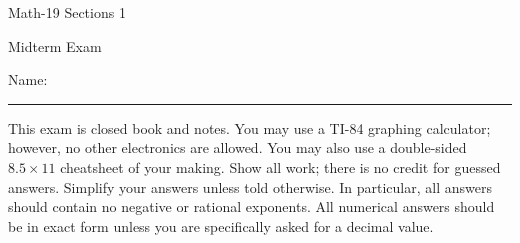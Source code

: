 \documentclass[letterpaper,12pt,fleqn]{article}
\begin{document}
\begin{center}
  \large
  Math-19 Sections 1

  \Large
  Midterm Exam
\end{center}

\vspace{0.5in}

Name: \rule{4in}{1pt}

\vspace{0.5in}

This exam is closed book and notes. You may use a TI-84 graphing calculator; however, no other electronics are
allowed.  You may also use a double-sided \(8.5\times11\) cheatsheet of your making.  Show all work; there is no
credit for guessed answers.  Simplify your answers unless told otherwise.  In particular, all answers should
contain no negative or rational exponents.  All numerical answers should be in exact form unless you are
specifically asked for a decimal value.

\vspace{0.5in}
\end{document}
